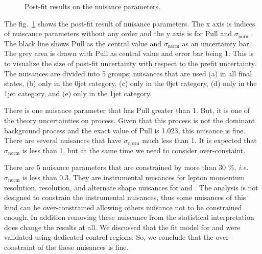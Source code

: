 \begin{figure}[!hbtp]
{}
\caption{Post-fit results on the nuisance parameters.}
\label{fig:postnuisance}
\end{figure}
The fig.~\ref{fig:postnuisance} shows the post-fit result of nuisance parameters. 
The x axis is indices of nuiscance parameters without any order and the y axis is for 
Pull and $\sigma_{\textrm{norm}}$. The black line shows Pull as the central value and 
$\sigma_{\textrm{norm}}$ as an uncertainty bar. The grey area is drawn with Pull as 
central value and error bar being 1. This is to visualize the size of post-fit 
uncertainty with respect to the prefit uncertainty. The nuisances are divided  
into 5 groups; nuisances that are used (a) in all final states, 
(b) only in the \DF{} 0jet category,  (c) only in the \SF{} 0jet category,  
(d) only in the \DF{} 1jet category,  and (e) only in the \SF{} 1jet category. 

There is one nuisance parameter that has Pull greater than 1. 
But, it is one of the theory uncertainties on \ggww process. 
Given that this process is not the dominant background process 
and the exact value of Pull is 1.023, this nuisance is fine.
There are several nuisances that have $\sigma_{\textrm{norm}}$ much 
less than 1. It is expected that $\sigma_{\textrm{norm}}$ is less than 1, 
but at the same time we need to consider over-constaint. 

There are 5 nuisance parameters that are constrained by more than 30 \%, 
\textit{i.e.} $\sigma_{\textrm{norm}}$ is less than 0.3. They are 
instrumental nuisances for lepton momentum resolution, \met{} resolution, 
and alternate shape nuisances for \qqww{} and \topbkg.
The analysis is not designed to constrain the instrumental nuisances, 
thus some nuisances of this kind can be over-constrained allowing 
others nuisance not to be constrained enough. In addition removing 
these nuiscance from the statistical interpretation does 
change the results at all. We discussed that the fit model 
for  \qqww{} and \topbkg{} were validated using dedicated control regions.  
So, we conclude that the over-constraint of the these nuisances is fine. 

